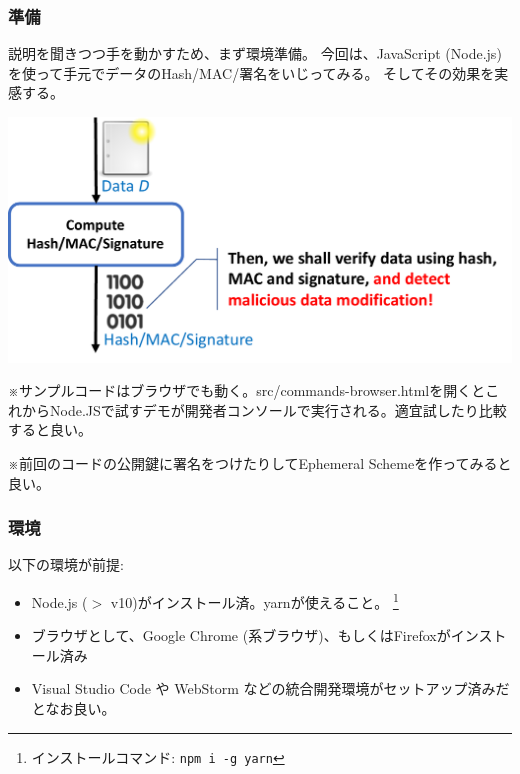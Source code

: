 \documentclass[12pt,dvipdfmx]{beamer}
\begin{document}
\begin{frame}
\frametitle{準備}
\small
説明を聞きつつ手を動かすため、まず環境準備。
\alert{今回は、JavaScript (Node.js) を使って手元でデータのHash/MAC/署名をいじってみる。}
そしてその効果を実感する。

\begin{center}
\includegraphics[width=0.7\linewidth]{Figs/md-flow.pdf}
\end{center}

\end{frame}

\begin{frame}

※\alert{サンプルコードはブラウザでも動く}。src/commands-browser.htmlを開くとこれからNode.JSで試すデモが開発者コンソールで実行される。適宜試したり比較すると良い。

\vspace{2ex}

※前回のコードの公開鍵に署名をつけたりしてEphemeral Schemeを作ってみると良い。
\end{frame}

\begin{frame}
\frametitle{環境}
以下の環境が前提:
\begin{itemize}
 \item Node.js ($>$ v10)がインストール済。yarnが使えること。 \footnote[frame]{インストールコマンド: \texttt{npm i -g yarn}}
 \item ブラウザとして、Google Chrome (系ブラウザ)、もしくはFirefoxがインストール済み
 \item Visual Studio Code や WebStorm などの統合開発環境がセットアップ済みだとなお良い。
\end{itemize}
\end{frame}
\end{document}
